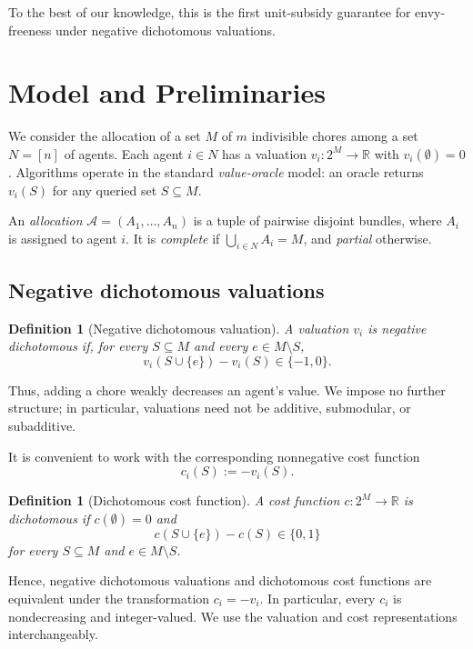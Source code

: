 \documentclass[sigconf,anonymous]{aamas}
\newcommand{\agents}{N}
\newcommand{\items}{M}
\newcommand{\alloc}{\mathcal{A}}
\newcommand{\bundle}[1]{A_{#1}}
\newcommand{\cost}{c}
\newcommand{\R}{\mathbb{R}}
\theoremstyle{acmplain}
\theoremstyle{acmdefinition}
\newtheorem{definition}[theorem]{Definition}
\theoremstyle{acmplain}
\begin{document}
To the best of our knowledge, this is the first unit-subsidy guarantee for envy-freeness under negative dichotomous valuations.

\section{Model and Preliminaries}
\label{sec:prelim}

We consider the allocation of a set $\items$ of $m$ indivisible chores
among a set $\agents=[n]$ of agents. Each agent $i\in\agents$ has a
valuation $v_i:2^{\items}\to\R$ with $v_i(\emptyset)=0$. Algorithms
operate in the standard \emph{value-oracle} model: an oracle returns
$v_i(S)$ for any queried set $S\subseteq\items$.

An \emph{allocation}
$\alloc=(\bundle{1},\ldots,\bundle{n})$ is a tuple of pairwise
disjoint bundles, where $\bundle{i}$ is assigned to agent $i$.
It is \emph{complete} if
$\bigcup_{i\in\agents}\bundle{i}=\items$, and \emph{partial}
otherwise.

\subsection{Negative dichotomous valuations}

\begin{definition}[Negative dichotomous valuation]
\label{def:negdich}
A valuation $v_i$ is \emph{negative dichotomous} if, for every
$S\subseteq\items$ and every $e\in\items\setminus S$,
\[
v_i(S\cup\{e\})-v_i(S)\in\{-1,0\}.
\]
\end{definition}

Thus, adding a chore weakly decreases an agent's value. We impose
no further structure; in particular, valuations need not be
additive, submodular, or subadditive.

It is convenient to work with the corresponding nonnegative cost
function
\[
\cost_i(S):=-v_i(S).
\]

\begin{definition}[Dichotomous cost function]
\label{def:dichcost}
A cost function $\cost:2^{\items}\to\R$ is \emph{dichotomous} if
$\cost(\emptyset)=0$ and
\[
\cost(S\cup\{e\})-\cost(S)\in\{0,1\}
\]
for every $S\subseteq\items$ and $e\in\items\setminus S$.
\end{definition}

Hence, negative dichotomous valuations and dichotomous cost
functions are equivalent under the transformation
$\cost_i=-v_i$. In particular, every $\cost_i$ is nondecreasing and
integer-valued. We use the valuation and cost representations
interchangeably.
\end{document}
